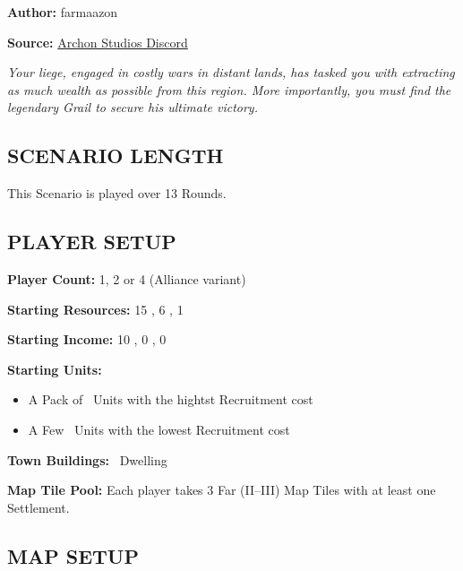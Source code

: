 
\begin{multicols}{2}

\textbf{Author:} farmaazon

\textbf{Source:} \href{https://discordapp.com/channels/740870068178649108/1344400556717768865/1344400556717768865}{Archon Studios Discord}

\textit{Your liege, engaged in costly wars in distant lands, has tasked you with extracting as much wealth as possible from this region. More importantly, you must find the legendary Grail to secure his ultimate victory.}

\subsection*{\MakeUppercase{Scenario Length}}

This Scenario is played over 13 Rounds.

\subsection*{\MakeUppercase{Player Setup}}

\textbf{Player Count:} 1, 2 or 4 (Alliance variant)

\textbf{Starting Resources:} 15 , 6 , 1 

\textbf{Starting Income:} 10 , 0 , 0 

\textbf{Starting Units:}
\begin{itemize}
  \item A Pack of \bronze\ Units with the hightst Recruitment cost
  \item A Few \silver\ Units with the lowest Recruitment cost
\end{itemize}

\textbf{Town Buildings:} \bronze\ Dwelling

\textbf{Map Tile Pool:} Each player takes 3 Far (II--III) Map Tiles with at least one Settlement.

\subsection*{\MakeUppercase{Map Setup}}


\end{multicols}
